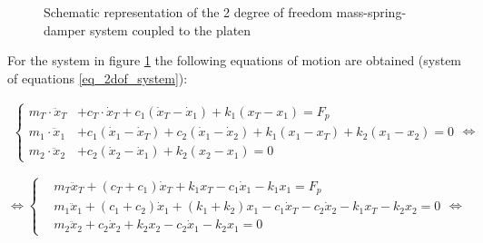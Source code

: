 \documentclass[9pt]{extarticle}
\begin{document}
\begin{figure}[H]
\caption{Schematic representation of the 2 degree of freedom mass-spring-damper system coupled to the platen}
\label{schematic_2dof}
\end{figure}


For the system in figure \ref{schematic_2dof} the following equations of motion are obtained (system of equations \ref{eq_2dof_system}):

\begin{align}\label{eq_2dof_system}
\left\{
\begin{aligned}
    m_T \cdot \ddot{x}_T &+ c_T \cdot \dot{x}_T + c_1 (\dot{x}_T -  \dot{x}_1) + k_1 (x_T - x_1) = F_p \\
    m_1 \cdot \ddot{x}_1 &+ c_1 ( \dot{x}_1 -\dot{x}_T) + c_2 ( \dot{x}_1 - \dot{x}_2) + k_1 (x_1 - x_T) + k_2 (x_1 - x_2) = 0 \\
    m_2 \cdot \ddot{x}_2 &+ c_2 ( \dot{x}_2 -\dot{x}_1) + k_2 (x_2 - x_1) = 0
\end{aligned}
\right. 
\Longleftrightarrow
\end{align}

\vspace{5mm}

\begin{equation*} 
\Longleftrightarrow
\left\{
\begin{aligned}
    &m_T  \ddot{x}_T + (c_T + c_1)  \dot{x}_T + k_1 x_T - c_1  \dot{x}_1 - k_1  x_1 = F_p \\
    &m_1  \ddot{x}_1 + (c_1 + c_2) \dot{x}_1 + (k_1 + k_2) x_1 - c_1  \dot{x}_T - c_2  \dot{x}_2 - k_1  x_T - k_2 x_2 = 0 \\
    &m_2  \ddot{x}_2 + c_2 \dot{x}_2 + k_2 x_2 - c_2  \dot{x}_1 - k_2 x_1 = 0
\end{aligned}
\right.
\Longleftrightarrow
\end{equation*}
\end{document}
